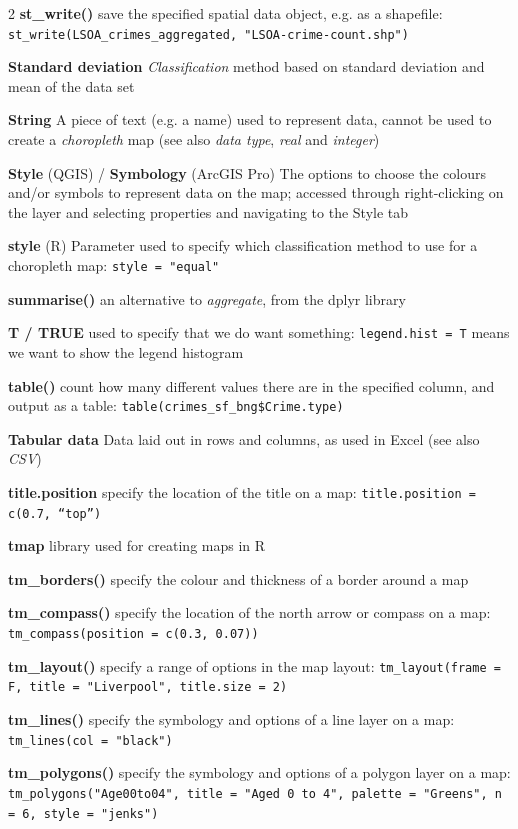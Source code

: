 \documentclass[a4paper,10pt]{article}
\newcommand{\q}[1]{``#1''} %
\begin{document}
\begin{multicols}{2}
\textbf{st\_write()} save the specified spatial data object, e.g. as a shapefile:  \texttt{st\_write(LSOA\_crimes\_aggregated, "LSOA-crime-count.shp")}

\textbf{Standard deviation} \textit{Classification} method based on standard deviation and mean of the data set  

\textbf{String} A piece of text (e.g. a name) used to represent data, cannot be used to create a \textit{choropleth} map (see also \textit{data type}, \textit{real} and \textit{integer}) 

\textbf{Style} (QGIS) / \textbf{Symbology} (ArcGIS Pro) The options to choose the colours and/or symbols to represent data on the map; accessed through right-clicking on the layer and selecting properties and navigating to the Style tab

\textbf{style} (R) Parameter used to specify which classification method to use for a choropleth map: \texttt{style = "equal"}

\textbf{summarise()} an alternative to \textit{aggregate}, from the dplyr library

\textbf{T / TRUE} used to specify that we do want something: \texttt{legend.hist = T} means we want to show the legend histogram

\textbf{table()} count how many different values there are in the specified column, and output as a table: \texttt{table(crimes\_sf\_bng\$Crime.type)}

\textbf{Tabular data} Data laid out in rows and columns, as used in Excel (see also \textit{CSV})

\textbf{title.position} specify the location of the title on a map: \texttt{title.position = c(0.7, \q{top})}

\textbf{tmap} library used for creating maps in R

\textbf{tm\_borders()} specify the colour and thickness of a border around a map

\textbf{tm\_compass()} specify the location of the north arrow or compass on a map: \texttt{tm\_compass(position = c(0.3, 0.07))}

\textbf{tm\_layout()} specify a range of options in the map layout: \texttt{tm\_layout(frame = F, title = "Liverpool", title.size = 2)}

\textbf{tm\_lines()} specify the symbology and options of a line layer on a map: \texttt{tm\_lines(col = "black")}

\textbf{tm\_polygons()} specify the symbology and options of a polygon layer on a map: \texttt{tm\_polygons("Age00to04", title = "Aged 0 to 4", palette = "Greens", n = 6, style = "jenks")}


\end{multicols}
\end{document}
